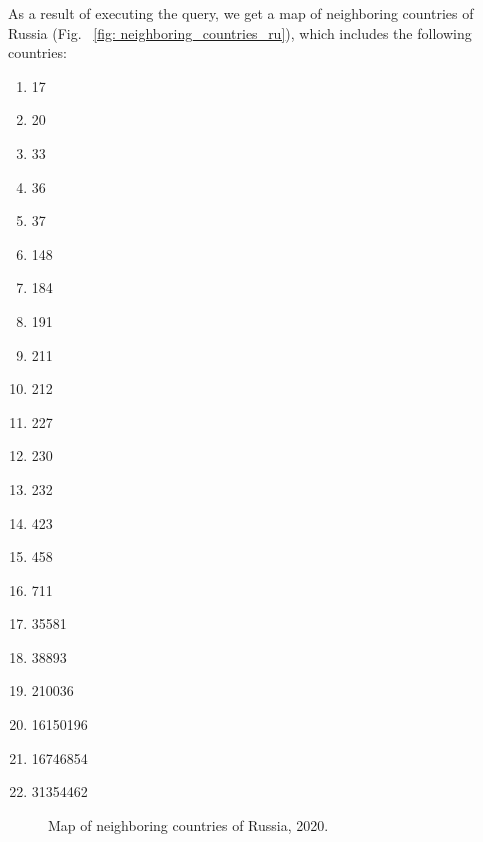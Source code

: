 As a result of executing the query, we get a map of neighboring countries of Russia (Fig. ~\ref {fig: neighboring_countries_ru}), which includes the following countries:
\begin{enumerate}
	\item {} {17}
	\item {} {20}
	\item {} {33}
	\item {} {36}
	\item {} {37}
	\item {} {148}
	\item {} {184}
	\item {} {191}
	\item {} {211}
	\item {} {212}
	\item {} {227}
	\item {} {230}
	\item {} {232}
	\item {} {423}
	\item {} {458}
	\item {} {711}
	\item {} {35581}
	\item {} {38893}
	\item {} {210036}
	\item {} {16150196}
	\item {} {16746854}
	\item {} {31354462}
\end{enumerate}


\begin{figure}
	{
		\setlength{\fboxsep}{0pt}%
		\setlength{\fboxrule}{1pt}%
	}
	\caption{Map of neighboring countries of Russia, 2020.
	}%
	\label{fig:neighboring_countries_ru}%
\end{figure}
